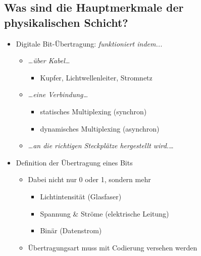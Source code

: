 \subsection*{Was sind die Hauptmerkmale der physikalischen Schicht?}
\begin{itemize}
    \item Digitale Bit-Übertragung: \textsl{funktioniert indem...}
    \begin{itemize}
        \item \textsl{\dots{}über Kabel\dots}
        \begin{itemize}
            \item Kupfer, Lichtwellenleiter, Stromnetz
        \end{itemize}
        \item \textsl{\dots{}eine Verbindung\dots}
        \begin{itemize}
            \item statisches Multiplexing (synchron)
            \item dynamisches Multiplexing (asynchron)
        \end{itemize}
        \item \textsl{\dots{}an die richtigen Steckplätze hergestellt wird.\dots}
    \end{itemize}
    \item Definition der Übertragung eines Bits
    \begin{itemize}
        \item Dabei nicht nur 0 oder 1, sondern mehr
        \begin{itemize}
            \item Lichtintensität (Glasfaser)
            \item Spannung \& Ströme (elektrische Leitung)
            \item Binär (Datenstrom)
        \end{itemize}
        \item Übertragungsart muss mit Codierung versehen werden
    \end{itemize}
\end{itemize}

